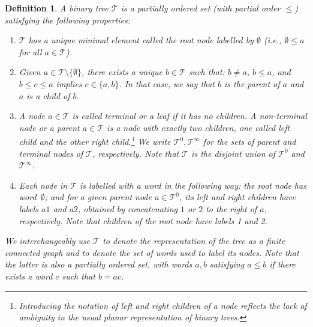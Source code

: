 \documentclass[a4paper,
11pt,  reqno]{amsart}
\newcommand{\5}{\textup{V}}
\newcommand{\noi}{\noindent}
\newtheorem{definition}[theorem]{Definition}
\theoremstyle{remark}
\newcommand{\TT}{\mathcal{T}}
\numberwithin{equation}{section}
\numberwithin{theorem}{section}
\begin{document}
\begin{definition}
\label{DEF:tree}
\rm
A \emph{binary tree} $\TT$ is a partially ordered set (with partial order $\le$) satisfying the following properties:

\begin{enumerate}
\item[(i)] $\TT$ has a unique minimal element called the \textit{root node} labelled by $\emptyset$ (i.e., $\emptyset \le a$ for all $a \in \TT$).

\smallskip
\item[(ii)] Given $a\in \TT\setminus \{ \emptyset \}$,
there exists a unique $b \in \TT$ such that: $b\ne a$, $b \le a$, and $b \le c \le a$ implies $c\in\{a,b\}$. In that case, we say that $b$ is the \textit{parent} of $a$ and $a$ is a \textit{child} of $b$.

\smallskip
\item[(iii)] A node $a\in \TT$ is called \textit{terminal} or a \textit{leaf} if it has no children. A \textit{non-terminal node} or a \textit{parent} $a\in\TT$ is a node with exactly two children, one called \textit{left child} and the other \textit{right child}.\footnote{Introducing the notation of left and right children of a node  reflects the lack of ambiguity in the usual planar representation of binary trees.}
We write $\TT^0, \TT^\infty$ for the sets of parent and terminal nodes of $\TT$, respectively.  Note that $\TT$ is the disjoint union of $\TT^0$ and $\TT^\infty$.

\smallskip
\item[(iv)]
Each node in $\TT$ is labelled with a word in the following way: the root node has word~$\emptyset$; and for a given parent node $a\in \TT^0$, its left and right children have labels $a1$ and $a2$,  obtained by concatenating $1$ or $2$ to the right of $a$, respectively. Note that children of the root node have labels 1 and 2.


\end{enumerate}



\noi
We interchangeably use $\TT$ to denote the representation of the tree as a finite connected graph and to denote the set of words used to label its nodes. Note that the latter is also a partially ordered set, with words $a,b$ satisfying $a\le b$ if there exists a word $c$ such that $b = ac$.



\end{definition}
\end{document}
